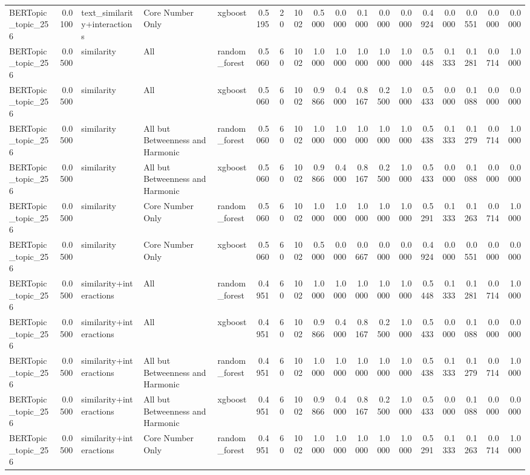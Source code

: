 \begin{tabular}{lrlllrrrrrrrrrrrrr}
BERTopic_topic_256 & 0.0100 & text_similarity+interactions & Core Number Only & xgboost & 0.5195 & 20 & 1002 & 0.5000 & 0.0000 & 0.1000 & 0.0000 & 0.0000 & 0.4924 & 0.0000 & 0.0551 & 0.0000 & 0.0000 \\
BERTopic_topic_256 & 0.0500 & similarity & All & random_forest & 0.5060 & 60 & 1002 & 1.0000 & 1.0000 & 1.0000 & 1.0000 & 1.0000 & 0.5448 & 0.1333 & 0.1281 & 0.0714 & 1.0000 \\
BERTopic_topic_256 & 0.0500 & similarity & All & xgboost & 0.5060 & 60 & 1002 & 0.9866 & 0.4000 & 0.8167 & 0.2500 & 1.0000 & 0.5433 & 0.0000 & 0.1088 & 0.0000 & 0.0000 \\
BERTopic_topic_256 & 0.0500 & similarity & All but Betweenness and Harmonic & random_forest & 0.5060 & 60 & 1002 & 1.0000 & 1.0000 & 1.0000 & 1.0000 & 1.0000 & 0.5438 & 0.1333 & 0.1279 & 0.0714 & 1.0000 \\
BERTopic_topic_256 & 0.0500 & similarity & All but Betweenness and Harmonic & xgboost & 0.5060 & 60 & 1002 & 0.9866 & 0.4000 & 0.8167 & 0.2500 & 1.0000 & 0.5433 & 0.0000 & 0.1088 & 0.0000 & 0.0000 \\
BERTopic_topic_256 & 0.0500 & similarity & Core Number Only & random_forest & 0.5060 & 60 & 1002 & 1.0000 & 1.0000 & 1.0000 & 1.0000 & 1.0000 & 0.5291 & 0.1333 & 0.1263 & 0.0714 & 1.0000 \\
BERTopic_topic_256 & 0.0500 & similarity & Core Number Only & xgboost & 0.5060 & 60 & 1002 & 0.5000 & 0.0000 & 0.0667 & 0.0000 & 0.0000 & 0.4924 & 0.0000 & 0.0551 & 0.0000 & 0.0000 \\
BERTopic_topic_256 & 0.0500 & similarity+interactions & All & random_forest & 0.4951 & 60 & 1002 & 1.0000 & 1.0000 & 1.0000 & 1.0000 & 1.0000 & 0.5448 & 0.1333 & 0.1281 & 0.0714 & 1.0000 \\
BERTopic_topic_256 & 0.0500 & similarity+interactions & All & xgboost & 0.4951 & 60 & 1002 & 0.9866 & 0.4000 & 0.8167 & 0.2500 & 1.0000 & 0.5433 & 0.0000 & 0.1088 & 0.0000 & 0.0000 \\
BERTopic_topic_256 & 0.0500 & similarity+interactions & All but Betweenness and Harmonic & random_forest & 0.4951 & 60 & 1002 & 1.0000 & 1.0000 & 1.0000 & 1.0000 & 1.0000 & 0.5438 & 0.1333 & 0.1279 & 0.0714 & 1.0000 \\
BERTopic_topic_256 & 0.0500 & similarity+interactions & All but Betweenness and Harmonic & xgboost & 0.4951 & 60 & 1002 & 0.9866 & 0.4000 & 0.8167 & 0.2500 & 1.0000 & 0.5433 & 0.0000 & 0.1088 & 0.0000 & 0.0000 \\
BERTopic_topic_256 & 0.0500 & similarity+interactions & Core Number Only & random_forest & 0.4951 & 60 & 1002 & 1.0000 & 1.0000 & 1.0000 & 1.0000 & 1.0000 & 0.5291 & 0.1333 & 0.1263 & 0.0714 & 1.0000 \\

\end{tabular}
